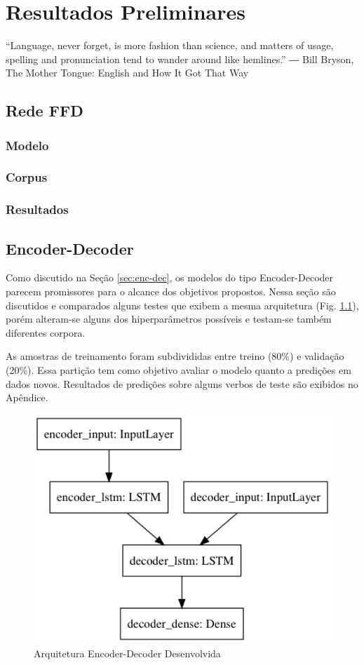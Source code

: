 \chapter{Resultados Preliminares}
\label{ch:03-results}

“Language, never forget, is more fashion than science, and matters of usage, spelling and pronunciation tend to wander around like hemlines.” 
― Bill Bryson, The Mother Tongue: English and How It Got That Way

\section{Rede FFD}
\label{sec:ffd}

\subsection{Modelo}
\subsection{Corpus}
\subsection{Resultados}

\section{Encoder-Decoder}
\label{sec:seq2seq}

Como discutido na Seção \ref{sec:enc-dec}, os modelos do tipo Encoder-Decoder parecem promissores para o alcance dos objetivos propostos. Nessa seção são discutidos e comparados alguns testes que exibem a mesma arquitetura (Fig. \ref{fig:encdec}), porém alteram-se alguns dos hiperparâmetros possíveis e testam-se também diferentes corpora.

As amostras de treinamento foram subdivididas entre treino (80\%) e validação (20\%). Essa partição tem como objetivo avaliar o modelo quanto a predições em dados novos. Resultados de predições sobre alguns verbos de teste são exibidos no Apêndice.

\begin{figure}[h]
  \centering
  \includegraphics[width=0.5\linewidth]{img/draw-model6.png}
  \caption{Arquitetura Encoder-Decoder Desenvolvida}
  \label{fig:encdec}
\end{figure}

